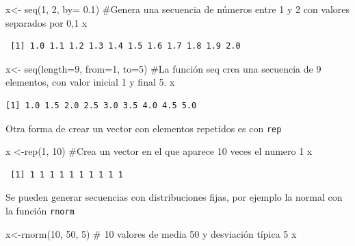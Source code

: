 \documentclass[
  letterpaper,
]{scrbook}
\newenvironment{Shaded}{\begin{snugshade}}{\end{snugshade}}
\newcommand{\AttributeTok}[1]{\textcolor[rgb]{0.40,0.45,0.13}{#1}}
\newcommand{\CommentTok}[1]{\textcolor[rgb]{0.37,0.37,0.37}{#1}}
\newcommand{\DecValTok}[1]{\textcolor[rgb]{0.68,0.00,0.00}{#1}}
\newcommand{\FloatTok}[1]{\textcolor[rgb]{0.68,0.00,0.00}{#1}}
\newcommand{\FunctionTok}[1]{\textcolor[rgb]{0.28,0.35,0.67}{#1}}
\newcommand{\NormalTok}[1]{\textcolor[rgb]{0.00,0.23,0.31}{#1}}
\newcommand{\OtherTok}[1]{\textcolor[rgb]{0.00,0.23,0.31}{#1}}
\begin{document}
\begin{Shaded}
\begin{Highlighting}[]
\NormalTok{x}\OtherTok{\textless{}{-}} \FunctionTok{seq}\NormalTok{(}\DecValTok{1}\NormalTok{, }\DecValTok{2}\NormalTok{, }\AttributeTok{by=} \FloatTok{0.1}\NormalTok{)}
\CommentTok{\#Genera una secuencia de números entre 1 y 2 con valores separados por 0,1 }
\NormalTok{x }
\end{Highlighting}
\end{Shaded}

\begin{verbatim}
 [1] 1.0 1.1 1.2 1.3 1.4 1.5 1.6 1.7 1.8 1.9 2.0
\end{verbatim}

\begin{Shaded}
\begin{Highlighting}[]
\NormalTok{x}\OtherTok{\textless{}{-}} \FunctionTok{seq}\NormalTok{(}\AttributeTok{length=}\DecValTok{9}\NormalTok{, }\AttributeTok{from=}\DecValTok{1}\NormalTok{, }\AttributeTok{to=}\DecValTok{5}\NormalTok{)}
\CommentTok{\#La función seq crea una secuencia de 9 elementos, con valor inicial 1 y final 5. }
\NormalTok{x}
\end{Highlighting}
\end{Shaded}

\begin{verbatim}
[1] 1.0 1.5 2.0 2.5 3.0 3.5 4.0 4.5 5.0
\end{verbatim}

Otra forma de crear un vector con elementos repetidos es con
\texttt{rep}

\begin{Shaded}
\begin{Highlighting}[]
\NormalTok{x }\OtherTok{\textless{}{-}}\FunctionTok{rep}\NormalTok{(}\DecValTok{1}\NormalTok{, }\DecValTok{10}\NormalTok{) }\CommentTok{\#Crea un vector en el que aparece 10 veces el numero 1 }
\NormalTok{x}
\end{Highlighting}
\end{Shaded}

\begin{verbatim}
 [1] 1 1 1 1 1 1 1 1 1 1
\end{verbatim}

Se pueden generar secuencias con distribuciones fijas, por ejemplo la
normal con la función \texttt{rnorm}

\begin{Shaded}
\begin{Highlighting}[]
\NormalTok{x}\OtherTok{\textless{}{-}}\FunctionTok{rnorm}\NormalTok{(}\DecValTok{10}\NormalTok{, }\DecValTok{50}\NormalTok{, }\DecValTok{5}\NormalTok{) }\CommentTok{\# 10 valores de media 50 y desviación típica 5 }
\NormalTok{x }
\end{Highlighting}
\end{Shaded}
\end{document}
